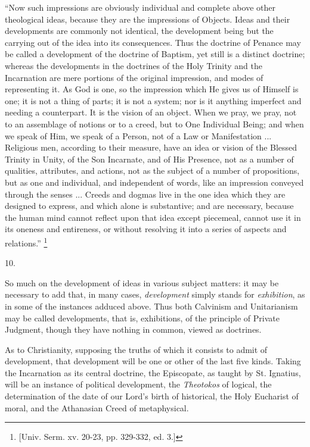 ``Now such impressions are obviously individual
and complete above other theological ideas, because they
are the impressions of Objects. Ideas and their
developments are commonly not identical, the development
being but the carrying out of the idea into its
consequences. Thus the doctrine of Penance may be called
a development of the doctrine of Baptism, yet still is a
distinct doctrine; whereas the developments in the
doctrines of the Holy Trinity and the Incarnation are
mere portions of the original impression, and modes of
representing it. As God is one, so the impression which
He gives us of Himself is one; it is not a thing of
parts; it is not a system; nor is it anything imperfect
and needing a counterpart. It is the vision of an object.
When we pray, we pray, not to an assemblage of notions or
to a creed, but to One Individual Being; and when we
speak of Him, we speak of a Person, not of a Law or
Manifestation ... Religious men, according to their
measure, have an idea or vision of the Blessed Trinity in
Unity, of the Son Incarnate, and of His Presence, not as
a number of qualities, attributes, and actions, not as
the subject of a number of propositions, but as one and
individual, and independent of words, like an impression
conveyed through the senses ... Creeds and dogmas live in
the one idea which they are designed to express, and
which alone is substantive; and are necessary, because
the human mind cannot reflect upon that idea except
piecemeal, cannot use it in its oneness and entireness,
or without resolving it into a series of aspects and
relations.'' \footnote{[Univ. Serm. xv. 20-23, pp.
329-332, ed. 3.]}

10.

So much on the development of ideas in various subject
matters: it may be necessary to add that, in many cases, \emph{development}
simply stands for \emph{exhibition}, as in some of the
instances adduced above. Thus both Calvinism and
Unitarianism may be called developments, that is,
exhibitions, of the principle of Private Judgment, though
they have nothing in common, viewed as doctrines.

As to Christianity, supposing the truths of which it
consists to admit of development, that development will
be one or other of the last five kinds. Taking the
Incarnation as its central doctrine, the Episcopate, as
taught by St. Ignatius, will be an instance of political
development, the \emph{Theotokos} of logical, the
determination of the date of our Lord's birth of
historical, the Holy Eucharist of moral, and the
Athanasian Creed of metaphysical.

